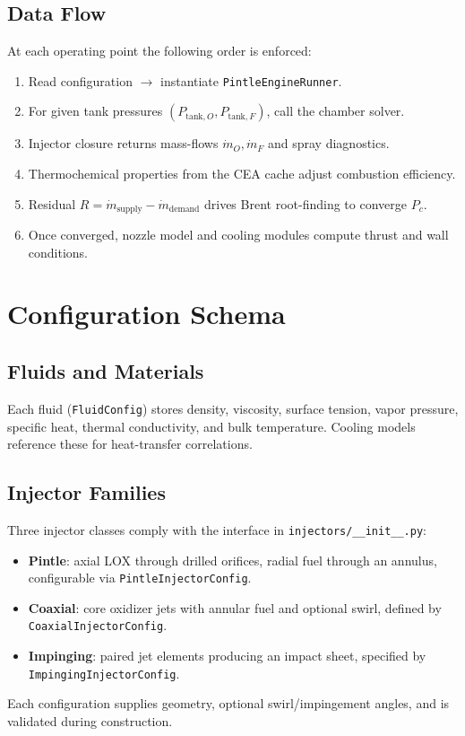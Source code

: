 \documentclass[12pt]{article}
\begin{document}
\subsection{Data Flow}
At each operating point the following order is enforced:
\begin{enumerate}
    \item Read configuration $\rightarrow$ instantiate \verb|PintleEngineRunner|.
    \item For given tank pressures $(P_{\text{tank},O}, P_{\text{tank},F})$, call the chamber solver.
    \item Injector closure returns mass-flows $\dot{m}_O, \dot{m}_F$ and spray diagnostics.
    \item Thermochemical properties from the CEA cache adjust combustion efficiency.
    \item Residual $R = \dot{m}_{\text{supply}} - \dot{m}_{\text{demand}}$ drives Brent root-finding to converge $P_c$.
    \item Once converged, nozzle model and cooling modules compute thrust and wall conditions.
\end{enumerate}

\section{Configuration Schema}

\subsection{Fluids and Materials}
Each fluid (\verb|FluidConfig|) stores density, viscosity, surface tension, vapor pressure, specific heat, thermal conductivity, and bulk temperature.  Cooling models reference these for heat-transfer correlations.

\subsection{Injector Families}
Three injector classes comply with the interface in \verb|injectors/__init__.py|:
\begin{itemize}
    \item \textbf{Pintle}: axial LOX through drilled orifices, radial fuel through an annulus, configurable via \verb|PintleInjectorConfig|.
    \item \textbf{Coaxial}: core oxidizer jets with annular fuel and optional swirl, defined by \verb|CoaxialInjectorConfig|.
    \item \textbf{Impinging}: paired jet elements producing an impact sheet, specified by \verb|ImpingingInjectorConfig|.
\end{itemize}
Each configuration supplies geometry, optional swirl/impingement angles, and is validated during construction.
\end{document}
